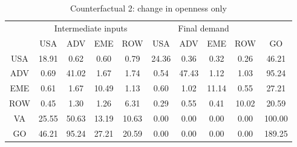 \begin{table}[p]
\begin{center}
\caption{Counterfactual 2: change in openness only}
\label{tab:iomat-trd-counter}
\small
\begin{tabular}{cccccccccc}
\toprule
& \multicolumn{4}{c}{Intermediate inputs}& \multicolumn{4}{c}{Final demand} & \\
\cmidrule(rl){2-5}\cmidrule(rl){6-9}
 &USA &ADV &EME &ROW &USA &ADV &EME &ROW& GO\\
\midrule
USA& 18.91& 0.62& 0.60& 0.79& 24.36& 0.36& 0.32& 0.26& 46.21 \\
ADV& 0.69& 41.02& 1.67& 1.74& 0.54& 47.43& 1.12& 1.03& 95.24 \\
EME& 0.61& 1.67& 10.49& 1.13& 0.60& 1.02& 11.14& 0.55& 27.21 \\
ROW& 0.45& 1.30& 1.26& 6.31& 0.29& 0.55& 0.41& 10.02& 20.59 \\
\midrule
VA& 25.55& 50.63& 13.19& 10.63& 0.00& 0.00& 0.00& 0.00& 100.00\\
\midrule
GO& 46.21& 95.24& 27.21& 20.59& 0.00& 0.00& 0.00& 0.00& 189.25\\
\bottomrule
\end{tabular}
\normalsize
\end{center}
\end{table}

